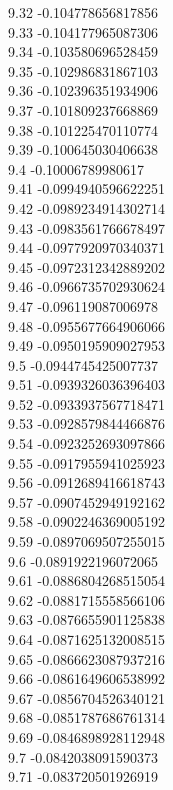 {9.32	-0.104778656817856\\
9.33	-0.104177965087306\\
9.34	-0.103580696528459\\
9.35	-0.102986831867103\\
9.36	-0.102396351934906\\
9.37	-0.101809237668869\\
9.38	-0.101225470110774\\
9.39	-0.100645030406638\\
9.4	-0.10006789980617\\
9.41	-0.0994940596622251\\
9.42	-0.0989234914302714\\
9.43	-0.0983561766678497\\
9.44	-0.0977920970340371\\
9.45	-0.0972312342889202\\
9.46	-0.0966735702930624\\
9.47	-0.096119087006978\\
9.48	-0.0955677664906066\\
9.49	-0.0950195909027953\\
9.5	-0.0944745425007737\\
9.51	-0.0939326036396403\\
9.52	-0.0933937567718471\\
9.53	-0.0928579844466876\\
9.54	-0.0923252693097866\\
9.55	-0.0917955941025923\\
9.56	-0.0912689416618743\\
9.57	-0.0907452949192162\\
9.58	-0.0902246369005192\\
9.59	-0.0897069507255015\\
9.6	-0.0891922196072065\\
9.61	-0.0886804268515054\\
9.62	-0.0881715558566106\\
9.63	-0.0876655901125838\\
9.64	-0.0871625132008515\\
9.65	-0.0866623087937216\\
9.66	-0.0861649606538992\\
9.67	-0.0856704526340121\\
9.68	-0.0851787686761314\\
9.69	-0.0846898928112948\\
9.7	-0.0842038091590373\\
9.71	-0.083720501926919\\
}
